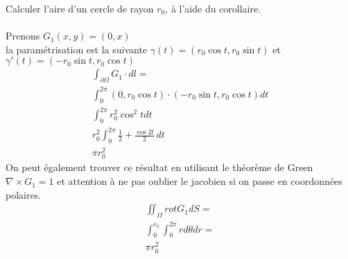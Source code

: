 \begin{myExample}
	Calculer l'aire d'un cercle de rayon $r_0$, à l'aide du corollaire.
	\\\\
	Prenons $G_1(x,y)=(0,x)$
	\\
	la paramétrisation est la suivante $\gamma(t)=(r_0\cos t, r_0\sin t)$ et $\gamma'(t)=(-r_0\sin t, r_0\cos t)$
	\begin{eqnarray*}
		\int_{\partial\Omega} G_1\cdot dl=
		\\
		\int_0^{2\pi}(0,r_0\cos t)\cdot(-r_0\sin t, r_0\cos t)dt
		\\
		\int_0^{2\pi}r_0^2\cos^2tdt
		\\
		r_0^2\int_0^{2\pi}\frac{1}{2}+\frac{\cos 2t}{2}\,dt
		\\
		\pi r_0^2
	\end{eqnarray*}
	On peut également trouver ce résultat en utilisant le théorème de Green
	\\
	$\nabla\times G_1=1$ et attention à ne pas oublier le jacobien si on passe en coordonnées polaires.
	\begin{eqnarray*}
		\iint_\Omega rot G_1 dS=
		\\
		\int_0^{r_0}\int_0^{2\pi}rd\theta dr=
		\\
		\pi r_0^2
	\end{eqnarray*}
\end{myExample}